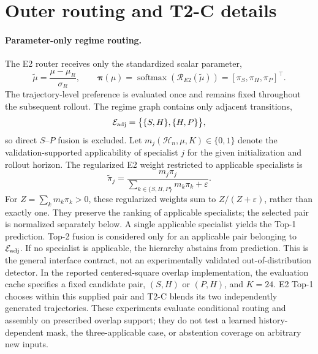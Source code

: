 \section{Outer routing and T2-C details}
\label{app:routing}

\paragraph{Parameter-only regime routing.}
The E2 router receives only the standardized scalar parameter,
\begin{equation}
  \widetilde\mu
  =
  \frac{\mu-\mu_R}{\sigma_R},
  \qquad
  \bm\pi(\mu)
  =
  \operatorname{softmax}
  \left(
    \mathcal R_{E2}(\widetilde\mu)
  \right)
  =
  [\pi_S,\pi_H,\pi_P]^\top .
  \label{eq:app_e2_parameter_only}
\end{equation}
The trajectory-level preference is evaluated once and remains fixed
throughout the subsequent rollout. The regime graph contains only adjacent transitions,
\begin{equation}
  \mathcal E_{\rm adj}
  =
  \bigl\{
    \{S,H\},
    \{H,P\}
  \bigr\},
  \label{eq:app_adjacency}
\end{equation}
so direct $S$--$P$ fusion is excluded.
Let
$m_j(\mathcal H_n,\mu,K)\in\{0,1\}$
denote the validation-supported applicability of specialist $j$ for the
given initialization and rollout horizon.
The regularized E2 weight restricted to applicable specialists is
\begin{equation}
  \widetilde\pi_j
  =
  \frac{
    m_j\pi_j
  }{
    \sum_{k\in\{S,H,P\}}m_k\pi_k+\varepsilon
  }.
  \label{eq:app_masked_e2}
\end{equation}
For $Z=\sum_k m_k\pi_k>0$, these regularized weights sum to $Z/(Z+\varepsilon)$, rather than exactly one. They preserve the ranking of applicable specialists; the selected pair is normalized separately below. A single applicable specialist yields the Top-1 prediction.
Top-2 fusion is considered only for an applicable pair belonging to
$\mathcal E_{\rm adj}$.
If no specialist is applicable, the hierarchy abstains from prediction. This is the general interface contract, not an experimentally validated out-of-distribution detector. In the reported centered-square overlap implementation, the evaluation cache specifies a fixed candidate pair, $(S,H)$ or $(P,H)$, and $K=24$. E2 Top-1 chooses within this supplied pair and T2-C blends its two independently generated trajectories. These experiments evaluate conditional routing and assembly on prescribed overlap support; they do not test a learned history-dependent mask, the three-applicable case, or abstention coverage on arbitrary new inputs.

